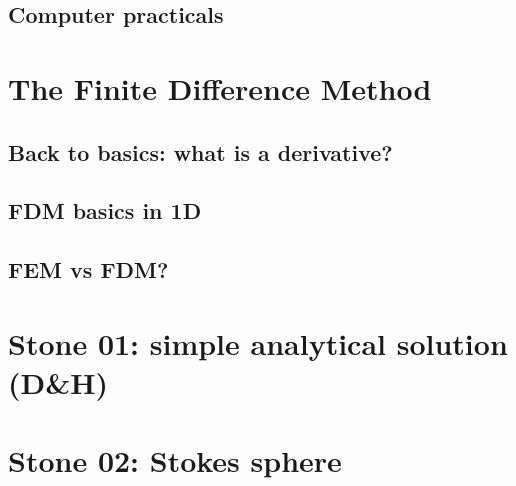\documentclass[a4paper]{article}
\begin{document}
\subsection{Computer practicals} 


\newpage
\section{The Finite Difference Method}

\subsection{Back to basics: what is a derivative?} 
\subsection{FDM basics in 1D} \label{ss:fdm_basics}  
\newpage
\subsection{FEM vs FDM?}\label{ss:femvsfdm}   




\newpage %
\section*{
Stone 01: simple analytical solution (D\&H) 
\label{f01}}

\newpage %
\section*{
Stone 02: Stokes sphere 
\label{f02}}
\end{document}
